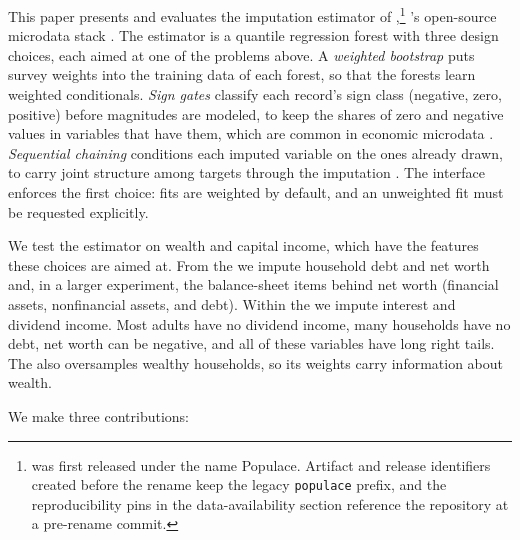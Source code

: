 This paper presents and evaluates the imputation estimator of
\populace{},\footnote{\populace{} was first released under the name
Populace. Artifact and release identifiers created before the rename keep
the legacy \texttt{populace} prefix, and the reproducibility pins in the
data-availability section reference the repository at a pre-rename commit.}
\policyengine{}'s open-source microdata stack \citep{microcosm2026}. The
estimator is a quantile regression forest with three design choices, each
aimed at one of the problems above. A \emph{weighted bootstrap} puts survey
weights into the training data of each forest, so that the forests learn
weighted conditionals. \emph{Sign gates} classify each record's sign class
(negative, zero, positive) before magnitudes are modeled, to keep the shares
of zero and negative values in variables that have them, which are common
in economic microdata \citep{mullahy1986specification, lambert1992zero}.
\emph{Sequential chaining} conditions each imputed variable on
the ones already drawn, to carry joint structure among targets through the
imputation \citep{raghunathan2001multivariate, vanbuuren2011mice}. The interface
enforces the first choice: fits are weighted by default, and an
unweighted fit must be requested explicitly.

We test the estimator on wealth and capital income, which have the features
these choices are aimed at. From the \scf{} we impute household debt and net
worth and, in a larger experiment, the balance-sheet items behind net worth
(financial assets, nonfinancial assets, and debt). Within the \cps{} we
impute interest and dividend income. Most adults have no dividend income,
many households have no debt, net worth can be negative, and all of these
variables have long right tails. The \scf{} also oversamples wealthy
households, so its weights carry information about wealth.

We make three contributions:

